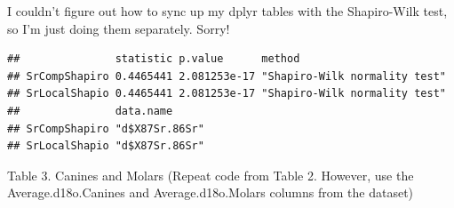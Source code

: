 \documentclass[]{article}
\newenvironment{Shaded}{\begin{snugshade}}{\end{snugshade}}
\newcommand{\KeywordTok}[1]{\textcolor[rgb]{0.13,0.29,0.53}{\textbf{#1}}}
\newcommand{\StringTok}[1]{\textcolor[rgb]{0.31,0.60,0.02}{#1}}
\newcommand{\OperatorTok}[1]{\textcolor[rgb]{0.81,0.36,0.00}{\textbf{#1}}}
\newcommand{\NormalTok}[1]{#1}
\begin{document}
I couldn't figure out how to sync up my dplyr tables with the
Shapiro-Wilk test, so I'm just doing them separately. Sorry!

\begin{Shaded}
\end{Shaded}

\begin{verbatim}
##               statistic p.value      method                       
## SrCompShapiro 0.4465441 2.081253e-17 "Shapiro-Wilk normality test"
## SrLocalShapio 0.4465441 2.081253e-17 "Shapiro-Wilk normality test"
##               data.name     
## SrCompShapiro "d$X87Sr.86Sr"
## SrLocalShapio "d$X87Sr.86Sr"
\end{verbatim}

Table 3. Canines and Molars (Repeat code from Table 2. However, use the
Average.d18o.Canines and Average.d18o.Molars columns from the dataset)
\end{document}
